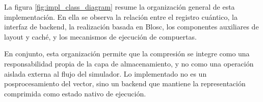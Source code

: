 La figura \ref{fig:impl_class_diagram} resume la organización general de esta
implementación. En ella se observa la relación entre el registro cuántico, la interfaz de
backend, la realización basada en Blosc, los componentes auxiliares de layout y caché, y
los mecanismos de ejecución de compuertas.

En conjunto, esta organización permite que la compresión se integre como una
responsabilidad propia de la capa de almacenamiento, y no como una operación aislada
externa al flujo del simulador. Lo implementado no es un posprocesamiento del vector,
sino un backend que mantiene la representación comprimida como estado nativo de
ejecución.
